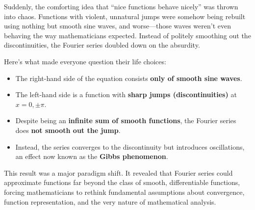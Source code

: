 Suddenly, the comforting idea that “nice functions behave nicely” was thrown into chaos. Functions with violent, unnatural jumps were somehow being rebuilt using nothing but smooth sine waves, and worse—those waves weren’t even behaving the way mathematicians expected. Instead of politely smoothing out the discontinuities, the Fourier series doubled down on the absurdity.

Here’s what made everyone question their life choices:

\begin{itemize}
    \item The right-hand side of the equation consists \textbf{only of smooth sine waves}.
    \item The left-hand side is a function with \textbf{sharp jumps (discontinuities)} at \( x = 0, \pm \pi \).
    \item Despite being an \textbf{infinite sum of smooth functions}, the Fourier series does \textbf{not smooth out the jump}.
    \item Instead, the series converges to the discontinuity but introduces oscillations, an effect now known as the \textbf{Gibbs phenomenon}.
\end{itemize}

This result was a major paradigm shift. It revealed that Fourier series could approximate functions far beyond the class of smooth, differentiable functions, forcing mathematicians to rethink fundamental assumptions about convergence, function representation, and the very nature of mathematical analysis.
